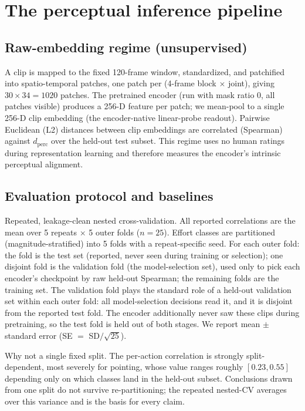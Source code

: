 \documentclass[letterpaper]{article} %
\begin{document}
\section{The perceptual inference pipeline}
\label{sec:pipeline}

\subsection{Raw-embedding regime (unsupervised)}
A clip is mapped to the fixed 120-frame window, standardized, and patchified into spatio-temporal
patches, one patch per (4-frame block $\times$ joint), giving $30 \times 34 = 1020$ patches. The
pretrained encoder (run with mask ratio 0, all patches visible) produces a 256-D feature per
patch; we mean-pool to a single {256-D clip embedding} (the encoder-native linear-probe
readout). Pairwise {Euclidean (L2) distances} between clip embeddings are correlated
(Spearman) against $d_{\text{perc}}$ over the held-out test subset. This regime uses {no
human ratings} during representation learning and therefore measures the encoder's intrinsic
perceptual alignment.

\subsection{Evaluation protocol and baselines}
\label{sec:baselines}
{Repeated, leakage-clean nested cross-validation.} All reported correlations are the mean
over {5 repeats $\times$ 5 outer folds ($n=25$)}. Effort classes are partitioned
(magnitude-stratified) into 5 folds with a repeat-specific seed. For each outer fold: the fold is
the {test} set (reported, never seen during training or selection); one disjoint fold is
the {validation} fold (the model-selection set), used {only} to pick each encoder's checkpoint
by raw held-out Spearman; the remaining folds are the {training} set. The validation fold plays
the standard role of a held-out validation set within each outer fold: all model-selection
decisions read it, and it is disjoint from the reported test fold. The encoder additionally never saw
these clips during pretraining, so the test fold is held out of both stages. We report mean $\pm$
standard error (SE $=$ SD$/\sqrt{25}$).

{Why not a single fixed split.} The per-action correlation is strongly split-dependent,
most severely for pointing, whose value ranges roughly $[0.23, 0.55]$ depending only on which
classes land in the held-out subset. Conclusions drawn from one split do not survive
re-partitioning; the repeated nested-CV averages over this variance and is the basis for every
claim.
\end{document}
